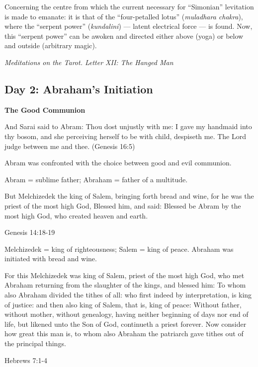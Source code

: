 \begin{quotationx}
Concerning the centre from which the current necessary for “Simonian” levitation is made to emanate: it is that of the
“four-petalled lotus” (\emph{muladhara chakra}), where the “serpent power” (\emph{kundalini}) —
latent electrical force — is found. Now, this “serpent power” can be awoken and directed either
above (yoga) or below and outside (arbitrary magic). \begin{flushright} \emph{Meditations on the Tarot. Letter XII: The Hanged Man}\end{flushright}

\end{quotationx}

\subsection*{Day 2: Abraham's Initiation}
\textbf{The Good Communion}

And Sarai said to Abram: Thou dost unjustly with me: I gave my handmaid into thy bosom, and she perceiving herself to be
with child, despiseth me. The Lord judge between me and thee. (Genesis 16:5)

Abram was confronted with the choice between good and evil communion.

Abram = sublime father; Abraham = father of a multitude.

But Melchizedek the king of Salem, bringing forth bread and wine, for he was the priest of the most high God, Blessed
him, and said: Blessed be Abram by the most high God, who created heaven and earth. 

Genesis 14:18-19

Melchizedek = king of righteousness; Salem = king of peace. Abraham was initiated with bread and wine.

For this Melchizedek was king of Salem, priest of the most high God, who met Abraham returning from the slaughter of the
kings, and blessed him: To whom also Abraham divided the tithes of all: who first indeed by interpretation, is king of
justice: and then also king of Salem, that is, king of peace: Without father, without mother, without genealogy, having
neither beginning of days nor end of life, but likened unto the Son of God, continueth a priest forever. Now consider
how great this man is, to whom also Abraham the patriarch gave tithes out of the principal things. 

Hebrews 7:1-4

